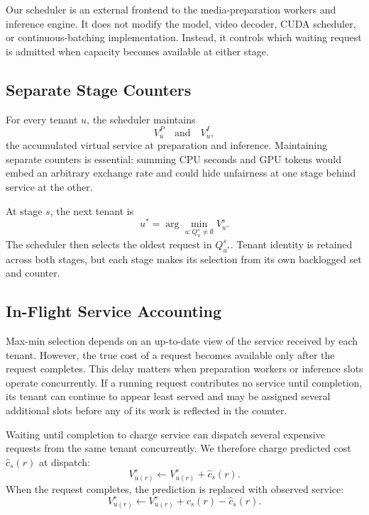 \documentclass[sigplan,anonymous,review,nonacm]{acmart}
\begin{document}
Our scheduler is an external frontend to the media-preparation workers and
inference engine. It does not modify the model, video decoder, CUDA scheduler,
or continuous-batching implementation. Instead, it controls which waiting
request is admitted when capacity becomes available at either stage.

\subsection{Separate Stage Counters}

For every tenant $u$, the scheduler maintains
\begin{equation}
V^P_u \quad\text{and}\quad V^I_u,
\end{equation}
the accumulated virtual service at preparation and inference. Maintaining
separate counters is essential: summing CPU seconds and GPU tokens would embed
an arbitrary exchange rate and could hide unfairness at one stage behind
service at the other.

At stage $s$, the next tenant is
\begin{equation}
u^* = \arg\min_{u:Q^s_u\neq\emptyset} V^s_u.
\label{eq:tenant-selection}
\end{equation}
The scheduler then selects the oldest request in $Q^s_{u^*}$. Tenant identity
is retained across both stages, but each stage makes its selection from its
own backlogged set and counter.

\subsection{In-Flight Service Accounting}

Max-min selection depends on an up-to-date view of the service received by
each tenant. However, the true cost of a request becomes available only after
the request completes. This delay matters when preparation workers or
inference slots operate concurrently. If a running request contributes no
service until completion, its tenant can continue to appear least served and
may be assigned several additional slots before any of its work is reflected
in the counter.

Waiting until completion to charge service can dispatch several expensive
requests from the same tenant concurrently. We therefore charge predicted
cost $\widehat{c}_s(r)$ at dispatch:
\begin{equation}
V^s_{u(r)} \leftarrow V^s_{u(r)} + \widehat{c}_s(r).
\end{equation}
When the request completes, the prediction is replaced with observed service:
\begin{equation}
V^s_{u(r)} \leftarrow V^s_{u(r)}
  + c_s(r)-\widehat{c}_s(r).
\label{eq:reconcile}
\end{equation}
\end{document}
